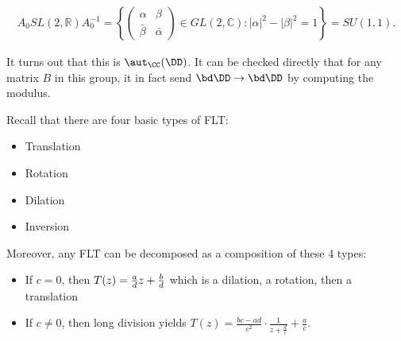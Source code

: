 \begin{align*}
A_{0} S L(2, \mathbb{R}) A_{0}^{-1}=\left\{\left(\begin{array}{cc}
\alpha & \beta \\
\bar{\beta} & \bar{\alpha}
\end{array}\right) \in G L(2, \mathbb{C}):|\alpha|^{2}-|\beta|^{2}=1\right\}=S U(1,1)
.\end{align*}

It turns out that this is \(\aut_\CC(\DD)\). It can be checked directly
that for any matrix \(B\) in this group, it in fact send
\(\bd \DD \to \bd \DD\) by computing the modulus.

Recall that there are four basic types of FLT:

\begin{itemize}
\tightlist
\item
  Translation
\item
  Rotation
\item
  Dilation
\item
  Inversion
\end{itemize}

Moreover, any FLT can be decomposed as a composition of these 4 types:

\begin{itemize}
\tightlist
\item
  If \(c=0\), then \(T(z) = {a \over d}z + {b\over d}\) which is a
  dilation, a rotation, then a translation
\item
  If \(c\neq 0\), then long division yields
  \(T(z)=\frac{b c-a d}{c^{2}} \cdot \frac{1}{z+\frac{d}{c}}+\frac{a}{c}\).
\end{itemize}

